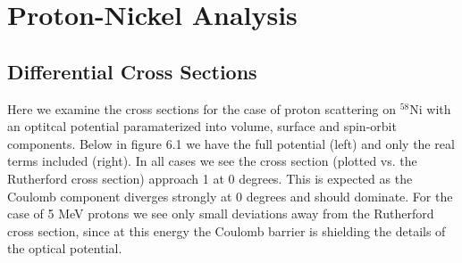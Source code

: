 \documentclass[paper=a4, fontsize=11pt]{scrartcl} %
\numberwithin{equation}{section} %
\numberwithin{figure}{section} %
\numberwithin{table}{section} %
\begin{document}
\section{Proton-Nickel Analysis}
\subsection{Differential Cross Sections}

Here we examine the cross sections for the case of proton scattering on $^{58}$Ni with an optitcal potential paramaterized into volume, surface and spin-orbit components.  Below in figure 6.1 we have the full potential (left) and only the real terms included (right).  In all cases we see the cross section (plotted vs. the Rutherford cross section) approach 1 at 0 degrees.  This is expected as the Coulomb component diverges strongly at 0 degrees and should dominate.  For the case of 5 MeV protons we see only small deviations away from the Rutherford cross section, since at this energy the Coulomb barrier is shielding the details of the optical potential.   
\end{document}

